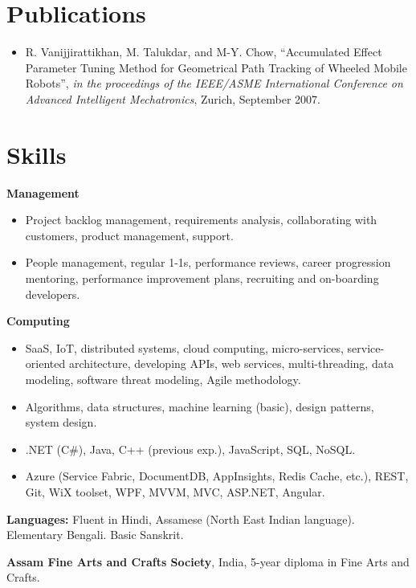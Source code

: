 \documentclass[letterpaper,10pt]{article}
\newcommand{\resumeItemListStart}{\begin{itemize}}
\newcommand{\resumeItemListEnd}{\end{itemize}}
\newcommand{\resumeListItem}[1]{
	\item{#1 \vspace{-6pt}}
}
\begin{document}
	\section{Publications}
	
	\resumeItemListStart
	\resumeListItem {R. Vanijjirattikhan, M. Talukdar, and M-Y. Chow, ``Accumulated Effect Parameter Tuning Method for Geometrical Path Tracking of Wheeled Mobile Robots'', \textit{in the proceedings of the IEEE/ASME International Conference on Advanced Intelligent Mechatronics}, Zurich, September 2007.}
	\resumeItemListEnd

	\section{Skills}

	\textbf{Management}\vspace{-8pt}
	\resumeItemListStart
	\resumeListItem{Project backlog management, requirements analysis, collaborating with customers, product management, support.}
	\resumeListItem {People management, regular 1-1s, performance reviews, career progression mentoring, performance improvement plans, recruiting and on-boarding developers.}
	\resumeItemListEnd

	\textbf{Computing}\vspace{-8pt}
	\resumeItemListStart
	\resumeListItem {SaaS, IoT, distributed systems, cloud computing, micro-services, service-oriented architecture, developing APIs, web services, multi-threading, data modeling, software threat modeling, Agile methodology.}
	\resumeListItem {Algorithms, data structures, machine learning (basic), design patterns, system design.}
	\resumeListItem {.NET (C\#), Java, C++ (previous exp.), JavaScript, SQL, NoSQL.}
	\resumeListItem {Azure (Service Fabric, DocumentDB, AppInsights, Redis Cache, etc.), REST, Git, WiX toolset, WPF, MVVM, MVC, ASP.NET, Angular.}
	\resumeItemListEnd

	\textbf{Languages:} Fluent in Hindi, Assamese (North East Indian language). Elementary Bengali. Basic Sanskrit.

	\textbf{Assam Fine Arts and Crafts Society}, India, 5-year diploma in Fine Arts and Crafts.

\end{document}
